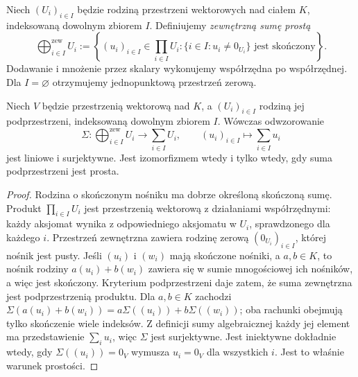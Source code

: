 \begin{definicja}
\label{def:lin2-zewnetrzna-suma-prosta}
Niech \((U_i)_{i\in I}\) będzie rodziną
przestrzeni wektorowych nad ciałem \(K\),
indeksowaną dowolnym zbiorem \(I\).
Definiujemy \emph{zewnętrzną sumę prostą}
\[
 \bigoplus_{i\in I}^{\mathrm{zew}}U_i
 :=\left\{(u_i)_{i\in I}\in\prod_{i\in I}U_i:
  \{i\in I:u_i\neq0_{U_i}\}\text{ jest skończony}\right\}.
\]
Dodawanie i mnożenie przez skalary
wykonujemy współrzędna po współrzędnej.
Dla \(I=\varnothing\) otrzymujemy
jednopunktową przestrzeń zerową.
\end{definicja}

\begin{twierdzenie}
\label{thm:lin2-zewn-wewn}
Niech \(V\) będzie przestrzenią wektorową nad \(K\),
a \((U_i)_{i\in I}\) rodziną jej podprzestrzeni,
indeksowaną dowolnym zbiorem \(I\).
Wówczas odwzorowanie
\[
 \Sigma\colon\bigoplus_{i\in I}^{\mathrm{zew}}U_i
 \longrightarrow\sum_{i\in I}U_i,\qquad
 (u_i)_{i\in I}\longmapsto\sum_{i\in I}u_i
\]
jest liniowe i surjektywne.
Jest izomorfizmem wtedy i tylko wtedy,
gdy suma podprzestrzeni jest prosta.
\end{twierdzenie}
\begin{proof}
Rodzina o skończonym nośniku ma dobrze określoną
skończoną sumę. Produkt \(\prod_{i\in I}U_i\)
jest przestrzenią wektorową z działaniami
współrzędnymi: każdy aksjomat wynika
z odpowiedniego aksjomatu w \(U_i\),
sprawdzonego dla każdego \(i\).
Przestrzeń zewnętrzna zawiera rodzinę zerową
\((0_{U_i})_{i\in I}\), której nośnik jest pusty.
Jeśli \((u_i)\) i \((w_i)\) mają skończone
nośniki, a \(a,b\in K\), to nośnik
rodziny \(a(u_i)+b(w_i)\) zawiera się
w sumie mnogościowej ich nośników,
a więc jest skończony.
Kryterium podprzestrzeni daje zatem,
że suma zewnętrzna jest podprzestrzenią produktu.
Dla \(a,b\in K\) zachodzi
\(\Sigma(a(u_i)+b(w_i))
=a\Sigma((u_i))+b\Sigma((w_i))\);
oba rachunki obejmują tylko skończenie wiele indeksów.
Z definicji sumy algebraicznej każdy jej element
ma przedstawienie \(\sum_i u_i\),
więc \(\Sigma\) jest surjektywne.
Jest iniektywne dokładnie wtedy,
gdy \(\Sigma((u_i))=0_V\) wymusza
\(u_i=0_V\) dla wszystkich \(i\).
Jest to właśnie warunek prostości.
\end{proof}

